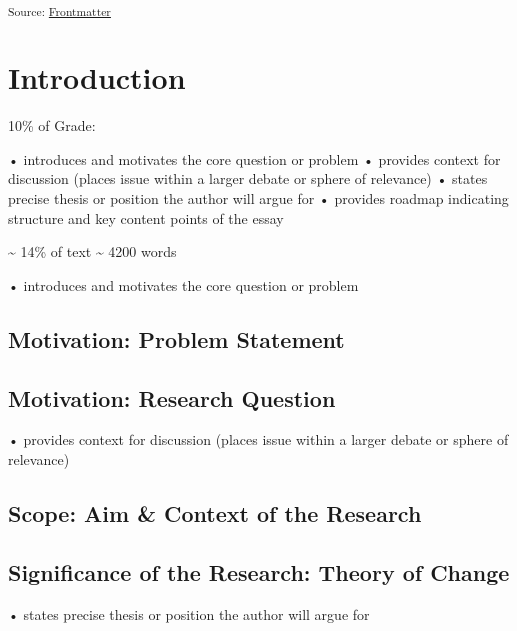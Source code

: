 \documentclass[11pt,a4paper]{report}
\begin{document}
\textsubscript{Source:
\href{https://VJMeyer.github.io/submission/chapters/Frontmatter-preview.html\#50c61980-44db-4184-ad58-ef7af8dc6ac1}{Frontmatter}}

\section{}\label{section-1}

\section{Introduction}\label{introduction}

10\% of Grade:

• introduces and motivates the core question or problem • provides
context for discussion (places issue within a larger debate or sphere of
relevance) • states precise thesis or position the author will argue for
• provides roadmap indicating structure and key content points of the
essay

\textasciitilde{} 14\% of text \textasciitilde{} 4200 words

• introduces and motivates the core question or problem

\subsection{Motivation: Problem
Statement}\label{motivation-problem-statement}

\subsection{Motivation: Research
Question}\label{motivation-research-question}

• provides context for discussion (places issue within a larger debate
or sphere of relevance)

\subsection{Scope: Aim \& Context of the
Research}\label{scope-aim-context-of-the-research}

\subsection{Significance of the Research: Theory of
Change}\label{significance-of-the-research-theory-of-change}

• states precise thesis or position the author will argue for
\end{document}
